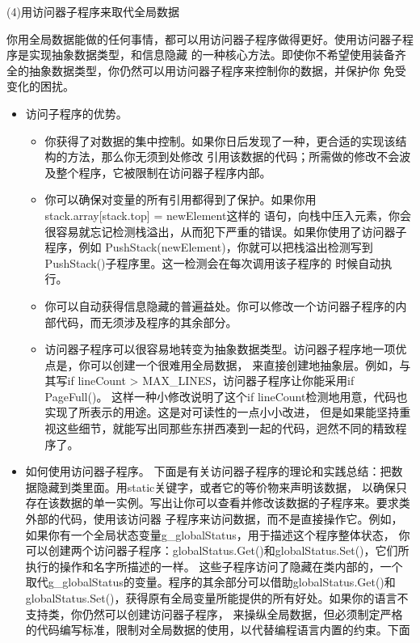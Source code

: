 \documentclass{article}
\begin{document}
\par
(4)用访问器子程序来取代全局数据
\par
你用全局数据能做的任何事情，都可以用访问器子程序做得更好。使用访问器子程序是实现抽象数据类型，和信息隐藏
的一种核心方法。即使你不希望使用装备齐全的抽象数据类型，你仍然可以用访问器子程序来控制你的数据，并保护你
免受变化的困扰。
\begin{itemize}
    \item 访问子程序的优势。
    \begin{itemize}
        \item 你获得了对数据的集中控制。如果你日后发现了一种，更合适的实现该结构的方法，那么你无须到处修改
        引用该数据的代码；所需做的修改不会波及整个程序，它被限制在访问器子程序内部。
        \item 你可以确保对变量的所有引用都得到了保护。如果你用stack.array[stack.top] = newElement这样的
        语句，向栈中压入元素，你会很容易就忘记检测栈溢出，从而犯下严重的错误。如果你使用了访问器子程序，例如
        PushStack(newElement)，你就可以把栈溢出检测写到PushStack()子程序里。这一检测会在每次调用该子程序的
        时候自动执行。
        \item 你可以自动获得信息隐藏的普遍益处。你可以修改一个访问器子程序的内部代码，而无须涉及程序的其余部分。
        \item 访问器子程序可以很容易地转变为抽象数据类型。访问器子程序地一项优点是，你可以创建一个很难用全局数据，
        来直接创建地抽象层。例如，与其写if lineCount > MAX\_LINES，访问器子程序让你能采用if PageFull()。
        这样一种小修改说明了这个if lineCount检测地用意，代码也实现了所表示的用途。这是对可读性的一点小小改进，
        但是如果能坚持重视这些细节，就能写出同那些东拼西凑到一起的代码，迥然不同的精致程序了。
    \end{itemize}
    \item 如何使用访问器子程序。
    下面是有关访问器子程序的理论和实践总结：把数据隐藏到类里面。用static关键字，或者它的等价物来声明该数据，
    以确保只存在该数据的单一实例。写出让你可以查看并修改该数据的子程序来。要求类外部的代码，使用该访问器
    子程序来访问数据，而不是直接操作它。例如，如果你有一个全局状态变量g\_globalStatus，用于描述这个程序整体状态，
    你可以创建两个访问器子程序：globalStatus.Get()和globalStatus.Set()，它们所执行的操作和名字所描述的一样。
    这些子程序访问了隐藏在类内部的，一个取代g\_globalStatus的变量。程序的其余部分可以借助globalStatus.Get()和
    globalStatus.Set()，获得原有全局变量所能提供的所有好处。如果你的语言不支持类，你仍然可以创建访问器子程序，
    来操纵全局数据，但必须制定严格的代码编写标准，限制对全局数据的使用，以代替编程语言内置的约束。下面

\end{itemize}
\end{document}
